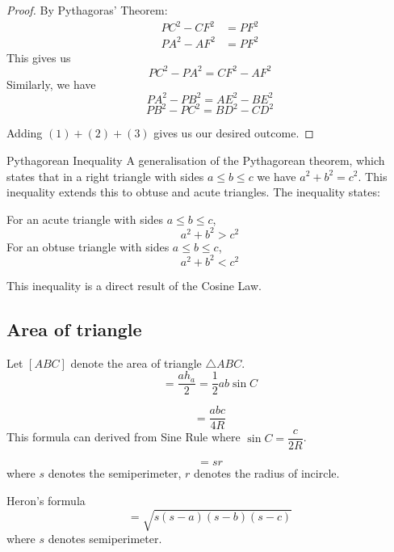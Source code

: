 \begin{proof}
By Pythagoras' Theorem:
\begin{align*}
PC^2 - CF^2 &= PF^2 \\
PA^2 - AF^2 &= PF^2
\end{align*}
This gives us
\begin{equation} \tag{1}
PC^2 - PA^2 = CF^2 - AF^2
\end{equation}
Similarly, we have
\begin{equation} \tag{2}
PA^2 - PB^2 = AE^2 - BE^2
\end{equation}
\begin{equation} \tag{3}
PB^2 - PC^2 = BD^2 - CD^2
\end{equation}

Adding $(1) + (2) + (3)$ gives us our desired outcome.
\end{proof}

\begin{thrm}{Pythagorean Inequality}{}
A generalisation of the Pythagorean theorem, which states that in a right triangle with sides $a \le b \le c$ we have $a^2 + b^2 = c^2$. This inequality extends this to obtuse and acute triangles. The inequality states:

For an acute triangle with sides $a \le b \le c$, \[ a^2+b^2>c^2 \] 
For an obtuse triangle with sides $a \le b \le c$, \[ a^2+b^2<c^2 \]
\end{thrm}

This inequality is a direct result of the Cosine Law.



\subsection{Area of triangle}
Let $[ABC]$ denote the area of triangle $\triangle ABC$.
\begin{equation}
[ABC] = \frac{a h_a}{2} = \frac{1}{2} ab \sin C
\end{equation}

\begin{equation}
[ABC] = \frac{abc}{4R} 
\end{equation}
This formula can derived from Sine Rule where $\sin C = \dfrac{c}{2R}$.

\begin{equation}
[ABC] = sr
\end{equation}
where $s$ denotes the semiperimeter, $r$ denotes the radius of incircle.

\begin{thrm}{Heron's formula}{}
\begin{equation}
[ABC] = \sqrt{s(s-a)(s-b)(s-c)} 
\end{equation} 
where $s$ denotes semiperimeter.
\end{thrm}

